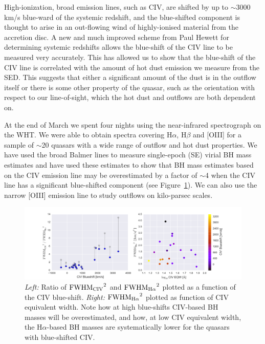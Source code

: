 High-ionization, broad emission lines, such as CIV, are shifted by up to $\sim$3000 km/s blue-ward of the systemic redshift, and the blue-shifted component is thought to arise in an out-flowing wind of highly-ionised material from the accretion disc. A new and much improved scheme from Paul Hewett for determining systemic redshifts allows the blue-shift of the CIV line to be measured very accurately. This has allowed us to show that the blue-shift of the CIV line is correlated with the amount of hot dust emission we measure from the SED. This suggests that either a significant amount of the dust is in the outflow itself or there is some other property of the quasar, such as the orientation with respect to our line-of-sight, which the hot dust and outflows are both dependent on. 

At the end of March we spent four nights using the near-infrared spectrograph on the WHT. We were able to obtain spectra covering H$\alpha$, H$\beta$ and [OIII] for a sample of $\sim$20 quasars with a wide range of outflow and hot dust properties. We have used the broad Balmer lines to measure single-epoch (SE) virial BH mass estimates and have used these estimates to show that BH mass estimates based on the CIV emission line may be overestimated by a factor of $\sim$4 when the CIV line has a significant blue-shifted component (see Figure~\ref{fig:figure2}). We can also use the narrow [OIII] emission line to study outflows on kilo-parsec scales.  

\begin{figure}
    \includegraphics[width=\columnwidth]{figures/chapter05/figure.pdf}
    \caption{{\it Left:} Ratio of ${\rm FWHM_{CIV}}^2$ and ${\rm FWHM_{H\alpha}}^2$  plotted as a function of the CIV blue-shift. {\it Right:} ${\rm FWHM_{H\alpha}}^2$ plotted as function of CIV equivalent width. Note how at high blue-shifts CIV-based BH masses will be overestimated, and how, at low CIV equivalent width, the H$\alpha$-based BH masses are systematically lower for the quasars with blue-shifted CIV.}
    \label{fig:figure2}
\end{figure}

